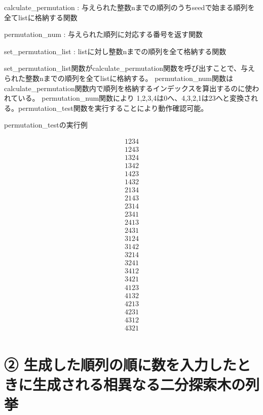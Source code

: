 \documentclass{ltjsarticle}
\begin{document}
\begin{list}{}{\leftmargin=1em}
\item calculate\_permutation : 与えられた整数nまでの順列のうちseedで始まる順列を全てlistに格納する関数
\item permutation\_num : 与えられた順列に対応する番号を返す関数
\item set\_permutation\_list : listに対し整数nまでの順列を全て格納する関数
\end{list}

set\_permutation\_list関数がcalculate\_permutation関数を呼び出すことで、与えられた整数nまでの順列を全てlistに格納する。
permutation\_num関数はcalculate\_permutation関数内で順列を格納するインデックスを算出するのに使われている。
permutation\_num関数により 1,2,3,4は0へ、4,3,2,1は23へと変換される。permutation\_test関数を実行することにより動作確認可能。

\textrm{permutation\_testの実行例}

\begin{align}
1 2 3 4\\
1 2 4 3\\
1 3 2 4\\
1 3 4 2\\
1 4 2 3\\
1 4 3 2\\
2 1 3 4\\
2 1 4 3\\
2 3 1 4\\
2 3 4 1\\
2 4 1 3\\
2 4 3 1\\
3 1 2 4\\
3 1 4 2\\
3 2 1 4\\
3 2 4 1\\
3 4 1 2\\
3 4 2 1\\
4 1 2 3\\
4 1 3 2\\
4 2 1 3\\
4 2 3 1\\
4 3 1 2\\
4 3 2 1\\
\end{align}

\section{➁ 生成した順列の順に数を入力したときに生成される相異なる二分探索木の列挙}
\end{document}
